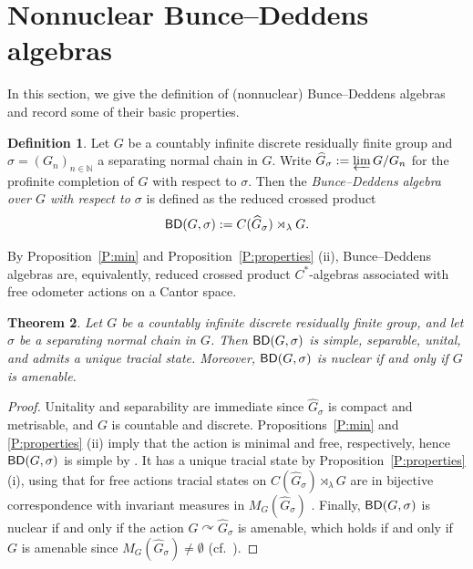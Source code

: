 \documentclass[11pt,a4,leqno]{amsart}
\newtheorem{thm}{Theorem}[section]
\theoremstyle{definition}
\newtheorem{df}[thm]{Definition}
\theoremstyle{remark}
\numberwithin{equation}{section}
\theoremstyle{plain}
\newcommand{\Nb}{\mathbb{N}}
\newcommand{\BD}{{\sf{BD}}}
\begin{document}
\section{Nonnuclear Bunce--Deddens algebras}\label{S:construction}

In this section, we give the definition of (nonnuclear) Bunce--Deddens algebras and record some of their basic properties. 

\begin{df}\label{D:BD}
    Let $G$ be a countably infinite discrete residually finite group and $\sigma = (G_n)_{n\in\Nb}$ a separating normal chain in $G$. Write $\widehat{G}_\sigma := \varprojlim G/G_n$ for the profinite completion of $G$ with respect to $\sigma$. Then the \emph{Bunce--Deddens algebra over $G$ with respect to $\sigma$} is defined as the reduced crossed product 
    \[
        \BD (G,\sigma) := C(\widehat{G}_\sigma)\rtimes_\lambda G. 
    \]
\end{df}

By Proposition~\ref{P:min} and Proposition~\ref{P:properties} (ii), Bunce--Deddens algebras are, equivalently, reduced crossed product $C^*$-algebras associated with free odometer actions on a Cantor space.

\begin{thm}\label{T:BD_properties}
Let $G$ be a countably infinite discrete residually finite group, and let $\sigma$ be a separating normal chain in $G$. Then $\BD (G,\sigma)$ is simple, separable, unital, and admits a unique tracial state. Moreover, $\BD (G,\sigma)$ is nuclear if and only if $G$ is amenable. 
\end{thm}

\begin{proof}
    Unitality and separability are immediate since $\widehat{G}_\sigma$ is compact and metrisable, and $G$ is countable and discrete. Propositions~\ref{P:min} and \ref{P:properties} (ii) imply that the action is minimal and free, respectively, hence $\BD (G,\sigma)$ is simple by \cite{ArcSpi94}. It has a unique tracial state by Proposition~\ref{P:properties} (i), using that for free actions tracial states on $C(\widehat{G}_\sigma)\rtimes_\lambda G$ are in bijective correspondence with invariant measures in $M_G(\widehat{G}_\sigma)$ \cite[Corollary 2.8]{KawTakTom90}. Finally, $\BD (G,\sigma)$ is nuclear if and only if the action $G\curvearrowright \widehat{G}_\sigma$ is amenable, which holds if and only if $G$ is amenable since $M_G(\widehat{G}_\sigma)\ne \emptyset$ (cf.~\cite[Lemma 2.2]{GarGefKraNar23}).   
\end{proof}
\end{document}
